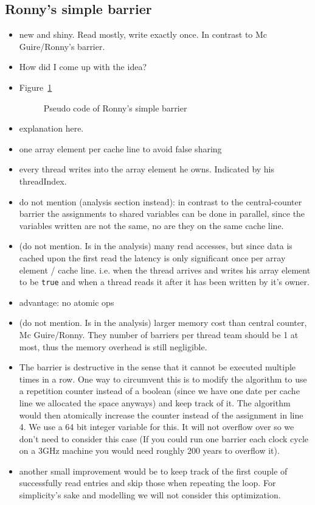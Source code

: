 \documentclass[a4paper, 10pt]{article}
\begin{document}
\subsection{Ronny's simple barrier}
\label{ssec:new-simple}
\begin{itemize}
	\item new and shiny. Read mostly, write exactly once. In contrast to Mc Guire/Ronny's barrier.
	\item How did I come up with the idea?
	\item Figure~\ref{fig:pseudo-code-ronny-simple}
		\begin{figure}[htbp]
			\centering
			
			\caption{Pseudo code of Ronny's simple barrier}
			\label{fig:pseudo-code-ronny-simple}
		\end{figure}
	\item explanation here.
	\item one array element per cache line to avoid false sharing\cite{falsesharing}
	\item every thread writes into the array element he owns. Indicated by his threadIndex.
	\item do not mention (analysis section instead): in contrast to the central-counter barrier the assignments to shared variables can be done in parallel, since the variables written are not the same, no are they on the same cache line.
	\item (do not mention. Is in the analysis) many read accesses, but since data is cached upon the first read the latency is only significant once per array element / cache line. i.e. when the thread arrives and writes his array element to be \texttt{true} and when a thread reads it after it has been written by it's owner.
	\item advantage: no atomic ops
	\item (do not mention. Is in the analysis) larger memory cost than central counter, Mc Guire/Ronny. They number of barriers per thread team should be 1 at most, thus the memory overhead is still negligible.
	\item The barrier is destructive in the sense that it cannot be executed multiple times in a row. One way to circumvent this is to modify the algorithm to use a repetition counter instead of a boolean (since we have one date per cache line we allocated the space anyways) and keep track of it. The algorithm would then atomically increase the counter instead of the assignment in line 4. We use a 64 bit integer variable for this. It will not overflow over so we don't need to consider this case (If you could run one barrier each clock cycle on a 3GHz machine you would need roughly 200 years to overflow it).
	\item another small improvement would be to keep track of the first couple of successfully read entries and skip those when repeating the loop. For simplicity's sake and modelling we will not consider this optimization.
\end{itemize}
\end{document}
